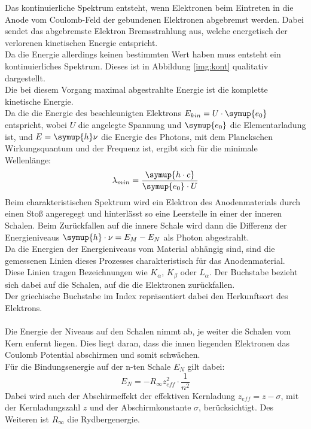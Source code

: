 \noindent
Das kontinuierliche Spektrum entsteht, wenn Elektronen beim Eintreten in die Anode vom Coulomb-Feld der gebundenen Elektronen abgebremst werden. 
Dabei sendet das abgebremste Elektron Bremsstrahlung aus, welche energetisch der verlorenen kinetischen Energie entspricht.\\
Da die Energie allerdings keinen bestimmten Wert haben muss entsteht ein kontinuierliches Spektrum. Dieses ist in Abbildung \ref{img:kont} qualitativ dargestellt.\\
Die bei diesem Vorgang maximal abgestrahlte Energie ist die komplette kinetische Energie.\\
Da die die Energie des beschleunigten Elektrons $E_{kin}= U \cdot \symup{e_0}$ entspricht, wobei $U$ die angelegte Spannung und $\symup{e_0}$ die Elementarladung \cite{e0} ist, und
$E= \symup{h} \nu$ die Energie des Photons, mit dem Planckschen Wirkungsquantum\cite{h} und der Frequenz ist, ergibt sich für die minimale Wellenlänge:
\begin{equation*}
    \lambda_{min}=\frac{\symup{h \cdot c}}{\symup{e_0}\cdot U}
\end{equation*}
\newline
\noindent
Beim charakteristischen Spektrum wird ein Elektron des Anodenmaterials durch einen Stoß angeregegt und hinterlässt so eine Leerstelle in einer der inneren Schalen. 
Beim Zurückfallen auf die innere Schale wird dann die Differenz der Energieniveaus $\symup{h} \cdot \nu=  E_M-E_N$ als Photon abgestrahlt.\\
Da die Energien der Energieniveaus vom Material abhängig sind, sind die gemessenen Linien dieses Prozesses charakteristisch für das Anodenmaterial.\\
Diese Linien tragen Bezeichnungen wie $K_\alpha$, $K_\beta$ oder $L_\alpha$. Der Buchstabe bezieht sich dabei auf die Schalen, auf die die Elektronen zurückfallen. \\
Der griechische Buchstabe im Index repräsentiert dabei den Herkunftsort des Elektrons.\\\\
Die Energie der Niveaus auf den Schalen nimmt ab, je weiter die Schalen vom Kern enfernt liegen. 
Dies liegt daran, dass die innen liegenden Elektronen das Coulomb Potential abschirmen und somit schwächen.\\
Für die Bindungsenergie auf der n-ten Schale $E_N$ gilt dabei:
\begin{equation*}
    E_N=-R_{\infty} z_{eff}^2 \cdot \frac{1}{n^2}
\end{equation*}
Dabei wird auch der Abschirmeffekt der effektiven Kernladung $z_{eff}=z-\sigma$, mit der Kernladungszahl $z$ und der Abschirmkonstante $\sigma$, berücksichtigt.
Des Weiteren ist $R_\infty$ die Rydbergenergie\cite{Ryd}.\\\\

